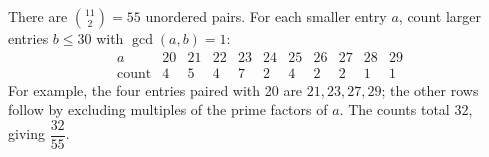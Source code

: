 There are $\binom{11}{2}=55$ unordered pairs. For each smaller entry $a$, count larger entries $b\le30$ with $\gcd(a,b)=1$:
\[\begin{array}{c|rrrrrrrrrr}a&20&21&22&23&24&25&26&27&28&29\\\text{count}&4&5&4&7&2&4&2&2&1&1\end{array}\]
For example, the four entries paired with 20 are $21,23,27,29$; the other rows follow by excluding multiples of the prime factors of $a$. The counts total $32$, giving $\boxed{\dfrac{32}{55}}$.
